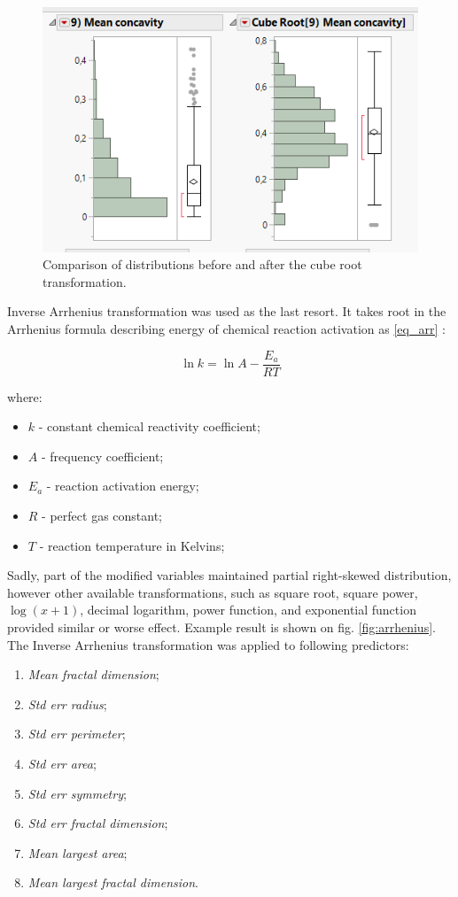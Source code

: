 \begin{figure}[!ht]
	\centering
	\includegraphics[width=0.7\linewidth]{Rysunki/Rozdzial3/cube_root}
	\caption{Comparison of distributions before and after the cube root transformation.}
	\label{fig:cuberoot}
\end{figure}

	Inverse Arrhenius transformation was used as the last resort. It takes root in the Arrhenius formula describing energy of chemical reaction activation as \ref{eq_arr} \cite{arr}:
	
	\begin{equation}
		\ln k = \ln A - \frac{E_a}{RT}
		\label{eq_arr}
	\end{equation}

	where: 
	\begin{itemize}
		\item $k$ - constant chemical reactivity coefficient;
		\item $A$ - frequency coefficient;
		\item $E_a$ - reaction activation energy;
		\item $R$ - perfect gas constant;
		\item $T$ - reaction temperature in Kelvins;
	\end{itemize}
	
	Sadly, part of the modified variables maintained partial right-skewed distribution, however other available transformations, such as square root, square power, $\log(x+1)$, decimal logarithm, power function, and exponential function provided similar or worse effect. Example result is shown on fig. \ref{fig:arrhenius}. The Inverse Arrhenius transformation was applied to following predictors:
	
	\begin{enumerate}
		\item \textit{Mean fractal dimension};
		\item \textit{Std err radius};
		\item \textit{Std err perimeter};
		\item \textit{Std err area};
		\item \textit{Std err symmetry};
		\item \textit{Std err fractal dimension};
		\item \textit{Mean largest area};
		\item \textit{Mean largest fractal dimension}.
	\end{enumerate}
	
